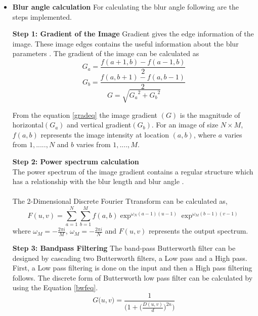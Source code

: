 	\begin{itemize}
	\item \textbf{Blur angle calculation} \hfill \break For calculating the blur angle following are the  steps implemented.%
	\par \textbf{Step 1: Gradient of the Image} \hfill \newline	
	Gradient gives the edge information of the image. These image edges contains the useful information about the blur parameters \cite{BlurredImageRestoration}. The gradient of the image can be calculated as
		\begin{equation}
		G_a=\frac{f(a+1,b) - f(a-1,b)}{2}
		\end{equation}
		\begin{equation}
		G_b=\frac{f(a,b+1) - f(a,b-1)}{2}
		\end{equation}
		\begin{equation}\label{gradeq}
		G = \sqrt{{G_a}^2+{G_b}^2}
		\end{equation}

	\vspace{0.2cm} \par{}From the equation \ref{gradeq} the image gradient $(G)$ is the magnitude of horizontal$(G_a)$ and vertical gradient$(G_b)$. For an image of size $N\times M$, $f(a,b)$ represents the image intensity at location $(a,b)$, where $a$ varies from $1,.....,N$ and $b$ varies from $1,....,M$.
	
	\par\textbf{Step 2: Power spectrum calculation} \hfill \\
	The power spectrum of the image gradient contains a regular structure which has a relationship with the blur length and blur angle \cite{BlurredImageRestoration}.
	\paragraph*{} The 2-Dimensional Discrete Fourier Ttransform can be calculated as,
	\begin{equation}\label{pseq}
	F(u,v)=\sum_{a=1}^{N}\sum_{b=1}^{M}f(a,b) \exp^{\omega_N (a-1)(u-1)} \exp^{\omega_M (b-1)(v-1)}
	\end{equation}
	where $\omega_M=-\frac{2\pi i}{M}$, $\omega_M=-\frac{2\pi i}{N}$ and $F(u,v)$ represents the output spectrum.
	\par \textbf{Step 3: Bandpass Filtering} \hfill \break
	 The band-pass Butterworth filter can be designed by cascading two Butterworth filters, a Low pass and a High pass. First, a Low pass filtering is done on the input and then a High pass filtering follows. The discrete form of Butterworth low pass filter can be calculated by using the Equation \ref{bwfeq}. 		
	\begin{equation}\label{bwfeq}
	G\big(u,v) = \frac{1}{\big(1+\big(\frac{D(u,v)}{d}\big)^{2 n}\big)}
	\end{equation}


\end{itemize}
